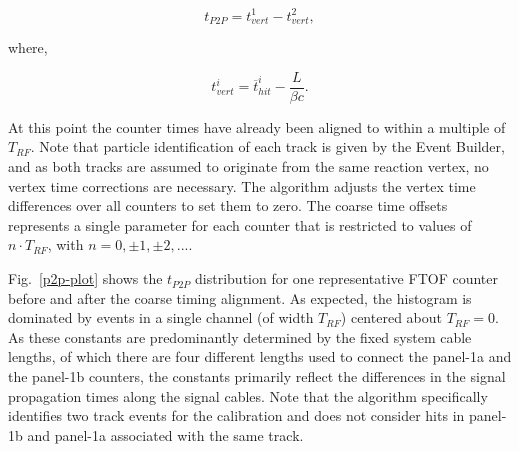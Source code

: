 \documentclass{elsart}
\begin{document}
\begin{equation}
t_{P2P} = t_{vert}^1 - t_{vert}^2,
\end{equation}

\noindent
where,

\begin{equation}
t_{vert}^i = \overline{t}_{hit}^i - \frac{L}{\beta c}.
\end{equation}

At this point the counter times have already been aligned to within a multiple of $T_{RF}$. Note that
particle identification of each track is given by the Event Builder, and as both tracks are assumed to
originate from the same reaction vertex, no vertex time corrections are necessary. The algorithm
adjusts the vertex time differences over all counters to set them to zero. The coarse time offsets
represents a single parameter for each counter that is restricted to values of $n \cdot T_{RF}$, with
$n = 0, \pm 1, \pm 2, ...$.

Fig.~\ref{p2p-plot} shows the $t_{P2P}$ distribution for one representative FTOF counter before and
after the coarse timing alignment. As expected, the histogram is dominated by events in a single channel
(of width $T_{RF}$) centered about $T_{RF} = 0$. As these constants are predominantly determined by the
fixed system cable lengths, of which there are four different lengths used to connect the panel-1a and the
panel-1b counters, the constants primarily reflect the differences in the signal propagation times along
the signal cables. Note that the algorithm specifically identifies two track events for the calibration and
does not consider hits in panel-1b and panel-1a associated with the same track.
\end{document}
